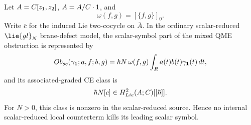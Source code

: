 \documentclass[11pt]{memoir}
\begin{document}
\begin{thm}
\label{thm:scalar-qme-alternatives}
  Let \(A=C[z_1,z_2]\), \(A=A/C\cdot1\), and
  \[
    \omega(f,g)=[\{f,g\}]_0 .
  \]
  Write \(\bar c\) for the induced Lie two-cocycle on \(\bar A\).
  In the ordinary scalar-reduced \(\lie{gl}_N\) brane-defect model, the
  scalar-symbol part of the mixed QME obstruction is represented by
  \[
    Ob_{sc}(\gamma_{\mathbf 1};a,f;b,g)
    =
    \hbar N\,\omega(f,g)
    \int_{R} a(t)b(t)\gamma_{\mathbf 1}(t)\,dt ,
  \]
  and its associated-graded CE class is
  \[
    \hbar N[c]\in H^2_{Lie}(A;C)[[\hbar]] .
  \]
  For \(N>0\), this class is nonzero in the scalar-reduced source.  Hence no
  internal scalar-reduced local counterterm kills its leading scalar symbol.


\end{thm}
\end{document}
